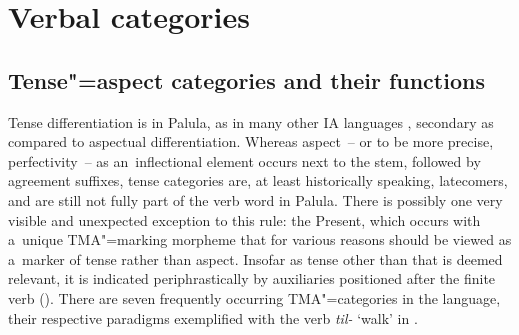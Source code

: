 \chapter{Verbal categories}
\label{chap:9}

\section{Tense"=aspect categories and their functions}
\label{sec:9-1}

Tense differentiation is in Palula, as in many other IA languages \citep[262]{masica1991}, secondary as compared to aspectual differentiation. Whereas aspect~-- or to be more precise, perfectivity~-- as an~inflectional element occurs next to the stem, followed by agreement suffixes, tense categories are, at least historically speaking, latecomers, and are still not fully part of the verb word in Palula. There is possibly one very visible and unexpected exception to this rule: the Present, which occurs with a~unique TMA"=marking morpheme that for various reasons should be viewed as a~marker of tense rather than aspect. Insofar as tense other than that is deemed relevant, it is indicated periphrastically by auxiliaries positioned after the finite verb (). There are seven frequently occurring TMA"=categories in the language, their respective paradigms exemplified with the verb \textit{til-} `walk' in .

